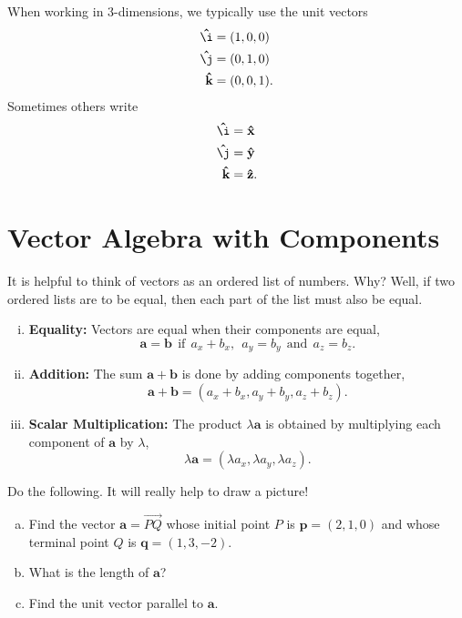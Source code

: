         
        When working in 3-dimensions, we typically use the unit vectors
        \begin{align*}
            \mathbf{\hat{\i}}&=(1,0,0)\\
            \mathbf{\hat{\j}}&=(0,1,0)\\
            \mathbf{\hat{k}}&=(0,0,1).
        \end{align*}
        Sometimes others write
        \begin{align*}
            \mathbf{\hat{\i}}&=\mathbf{\hat{x}}\\
            \mathbf{\hat{\j}}&=\mathbf{\hat{y}}\\
            \mathbf{\hat{k}}&=\mathbf{\hat{z}}.
        \end{align*}

    \section{Vector Algebra with Components}
        It is helpful to think of vectors as an ordered list of numbers. Why? Well, if two ordered lists are to be equal, then each part of the list must also be equal. \begin{enumerate}[(i)]
            \item \textbf{Equality:} Vectors are equal when their components are equal,
            \[
            \mathbf{a}=\mathbf{b} ~~ \textrm{if} ~~ a_x+b_x, ~~ a_y=b_y ~~ \textrm{and} ~~ a_z=b_z.
            \]
            \item \textbf{Addition:} The sum $\mathbf{a}+\mathbf{b}$ is done by adding components together,
            \[
            \mathbf{a}+\mathbf{b}=(a_x+b_x,a_y+b_y,a_z+b_z).
            \]
            \item \textbf{Scalar Multiplication:} The product $\lambda \mathbf{a}$ is obtained by multiplying each component of $\mathbf{a}$ by $\lambda$,
            \[
            \lambda \mathbf{a}=(\lambda a_x,\lambda a_y, \lambda a_z).
            \]
        \end{enumerate}
        
        \begin{exercise} Do the following.  It will really help to draw a picture!
        \begin{enumerate}[(a)] 
            \item Find the vector $\mathbf{a}=\overrightarrow{PQ}$ whose initial point $P$ is $\mathbf{p}=(2,1,0)$ and whose terminal point $Q$ is $\mathbf{q}=(1,3,-2)$.
            \item What is the length of $\mathbf{a}$?
            \item Find the unit vector parallel to $\mathbf{a}$.
        \end{enumerate}
        \end{exercise}
        

